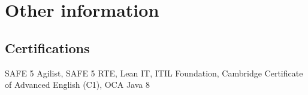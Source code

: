 \documentclass[letterpaper]{twentysecondcv} %
\begin{document}

\section{Other information}
\subsection{Certifications}
SAFE 5 Agilist, SAFE 5 RTE, Lean IT, ITIL Foundation, Cambridge Certificate of Advanced English (C1), OCA Java 8








\end{document}
